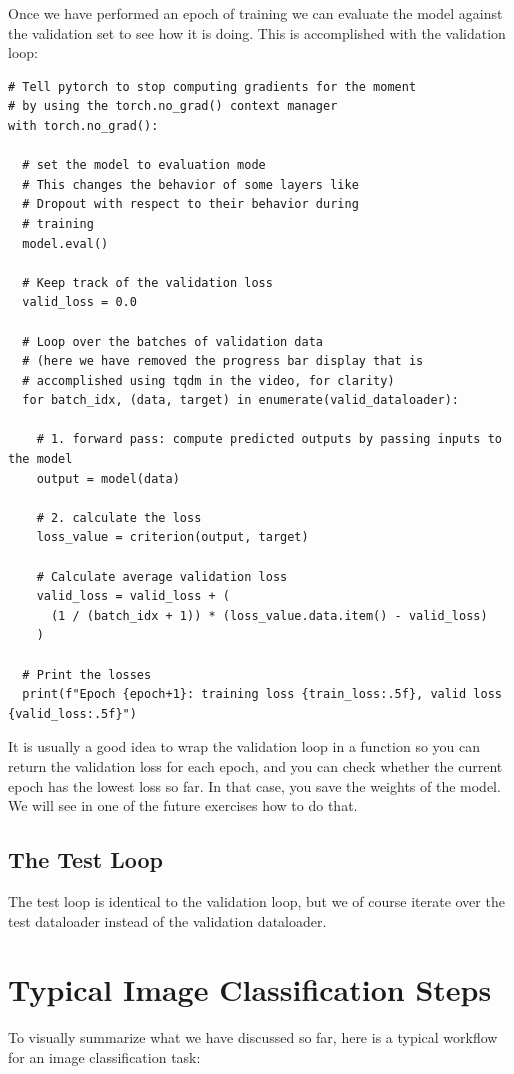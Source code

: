 Once we have performed an epoch of training we can evaluate the model against the validation set to see how it is doing. This is accomplished with the validation loop:
\begin{lstlisting}
# Tell pytorch to stop computing gradients for the moment
# by using the torch.no_grad() context manager
with torch.no_grad():

  # set the model to evaluation mode
  # This changes the behavior of some layers like
  # Dropout with respect to their behavior during
  # training
  model.eval()

  # Keep track of the validation loss
  valid_loss = 0.0

  # Loop over the batches of validation data
  # (here we have removed the progress bar display that is
  # accomplished using tqdm in the video, for clarity)
  for batch_idx, (data, target) in enumerate(valid_dataloader):

    # 1. forward pass: compute predicted outputs by passing inputs to the model
    output = model(data)

    # 2. calculate the loss
    loss_value = criterion(output, target)

    # Calculate average validation loss
    valid_loss = valid_loss + (
      (1 / (batch_idx + 1)) * (loss_value.data.item() - valid_loss)
    )

  # Print the losses 
  print(f"Epoch {epoch+1}: training loss {train_loss:.5f}, valid loss {valid_loss:.5f}")
\end{lstlisting}
It is usually a good idea to wrap the validation loop in a function so you can return the validation loss for each epoch, and you can check whether the current epoch has the lowest loss so far. In that case, you save the weights of the model. We will see in one of the future exercises how to do that.

\subsection{The Test Loop}

The test loop is identical to the validation loop, but we of course iterate over the test dataloader instead of the validation dataloader.

\section{Typical Image Classification Steps}
To visually summarize what we have discussed so far, here is a typical workflow for an image classification task:

